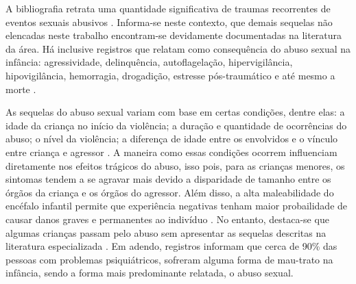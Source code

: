 \begin{parcolumns}{2}

\end{parcolumns}

\vspace{0.5 cm}

A bibliografia retrata uma quantidade significativa de traumas recorrentes de eventos sexuais abusivos \cite{pavao2013impasse, santos2011guia, deslandes2016atendimento, mariscal2003programa, acuna2014abuso, world2003guidelines}. Informa-se neste contexto, que demais sequelas não elencadas neste trabalho encontram-se devidamente documentadas na literatura da área. Há inclusive registros que relatam como consequência do abuso sexual na infância: agressividade, delinquência, autoflagelação, hipervigilância, hipovigilância, hemorragia, drogadição, estresse pós-traumático e até mesmo a morte \cite{meurer2017direitos}. 

As sequelas do abuso sexual variam com base em certas condições, dentre elas: a idade da criança no início da violência; a duração e quantidade de ocorrências do abuso; o nível da violência; a diferença de idade entre os envolvidos e o vínculo entre criança e agressor \cite{florentino2015possiveis}. A maneira como essas condições ocorrem influenciam diretamente nos efeitos trágicos do abuso, isso pois, para as crianças menores, os sintomas tendem a se agravar mais devido a disparidade de tamanho entre os órgãos da criança e os órgãos do agressor. Além disso, a alta maleabilidade do encéfalo infantil permite que experiência negativas tenham maior probailidade de causar danos graves e permanentes ao indivíduo \cite{pereira2011crescimento}. No entanto, destaca-se que algumas crianças passam pelo abuso sem apresentar as sequelas descritas na literatura especializada \cite{aded2006abuso}. Em adendo, registros informam que cerca de 90\% das pessoas com problemas psiquiátricos, sofreram alguma forma de mau-trato na infância, sendo a forma mais predominante relatada, o abuso sexual. 

